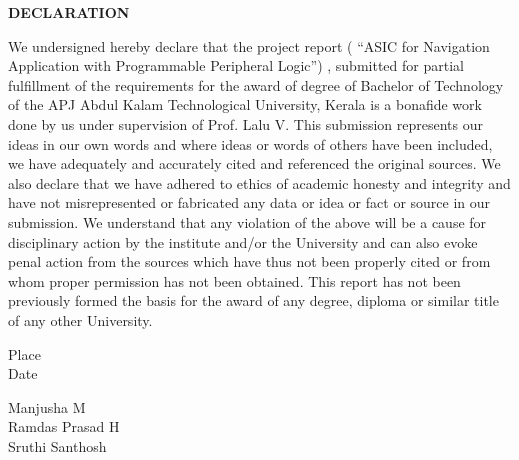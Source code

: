 \documentclass[12pt,a4paper]{report}
\begin{document}
\newpage
\begin{center}
\textbf{\large DECLARATION}
\end{center}
We undersigned hereby declare that the project report ( “ASIC for Navigation Application with Programmable Peripheral Logic”) , submitted for partial fulfillment of the requirements for the award of degree of Bachelor of Technology of the APJ Abdul Kalam Technological University, Kerala is a bonafide work done by us under supervision of Prof. Lalu V. This submission represents our ideas in our own words and where ideas or words of others have been included, we have adequately and accurately cited and referenced the original sources. We also declare that we have
adhered to ethics of academic honesty and integrity and have not misrepresented or fabricated any data or idea or fact or source in our submission. We understand that any violation of the above will be a cause for disciplinary action by the institute and/or the
University and can also evoke penal action from the sources which have thus not been properly cited or from whom proper permission has not been obtained. This report has not been previously formed the basis for the award of any degree, diploma or similar title of any other University.\\
\noindent 
\begin{minipage}{0.45\linewidth}
\begin{flushleft}
\vspace{1 cm}
                         
Place \\
Date\\

\end{flushleft} 
\end{minipage}
\hfill
\begin{minipage}{0.45\linewidth}
\begin{flushright}                                      
\vspace{2cm}
Manjusha M\\
\vspace{2cm}                         
Ramdas Prasad H\\
\vspace{2cm}
Sruthi Santhosh\\


\end{flushright} 
\end{minipage}
\end{document}
